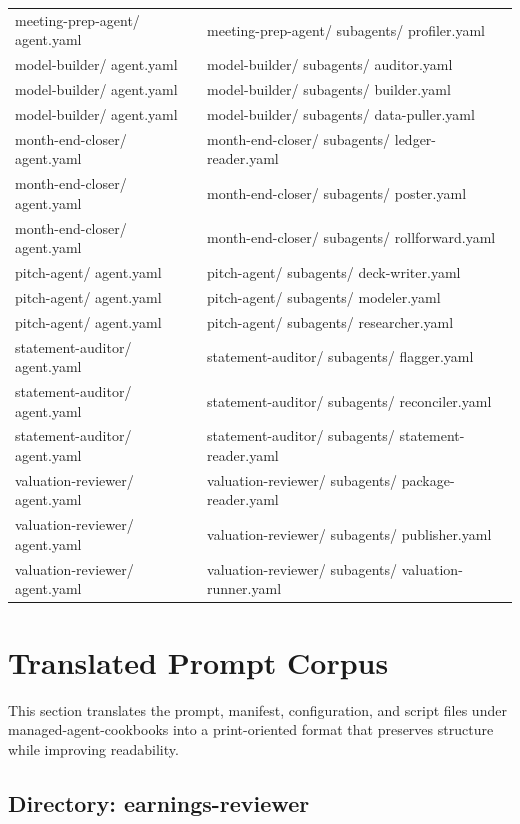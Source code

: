\documentclass[11pt]{article}
\begin{document}
\begin{longtable}{>{\RaggedRight\arraybackslash\hspace{0pt}}p{}>{\RaggedRight\arraybackslash\hspace{0pt}}p{}}
{} meeting-prep-agent/ agent.yaml & meeting-prep-agent/ subagents/ profiler.yaml \\
{} model-builder/ agent.yaml & model-builder/ subagents/ auditor.yaml \\
{} model-builder/ agent.yaml & model-builder/ subagents/ builder.yaml \\
{} model-builder/ agent.yaml & model-builder/ subagents/ data-puller.yaml \\
{} month-end-closer/ agent.yaml & month-end-closer/ subagents/ ledger-reader.yaml \\
{} month-end-closer/ agent.yaml & month-end-closer/ subagents/ poster.yaml \\
{} month-end-closer/ agent.yaml & month-end-closer/ subagents/ rollforward.yaml \\
{} pitch-agent/ agent.yaml & pitch-agent/ subagents/ deck-writer.yaml \\
{} pitch-agent/ agent.yaml & pitch-agent/ subagents/ modeler.yaml \\
{} pitch-agent/ agent.yaml & pitch-agent/ subagents/ researcher.yaml \\
{} statement-auditor/ agent.yaml & statement-auditor/ subagents/ flagger.yaml \\
{} statement-auditor/ agent.yaml & statement-auditor/ subagents/ reconciler.yaml \\
{} statement-auditor/ agent.yaml & statement-auditor/ subagents/ statement-reader.yaml \\
{} valuation-reviewer/ agent.yaml & valuation-reviewer/ subagents/ package-reader.yaml \\
{} valuation-reviewer/ agent.yaml & valuation-reviewer/ subagents/ publisher.yaml \\
{} valuation-reviewer/ agent.yaml & valuation-reviewer/ subagents/ valuation-runner.yaml \\
\bottomrule
\end{longtable}
\endgroup

\newpage

\section{Translated Prompt Corpus}

This section translates the prompt, manifest, configuration, and script files under managed-agent-cookbooks into a print-oriented format that preserves structure while improving readability.

\subsection{Directory: earnings-reviewer}
\end{document}
